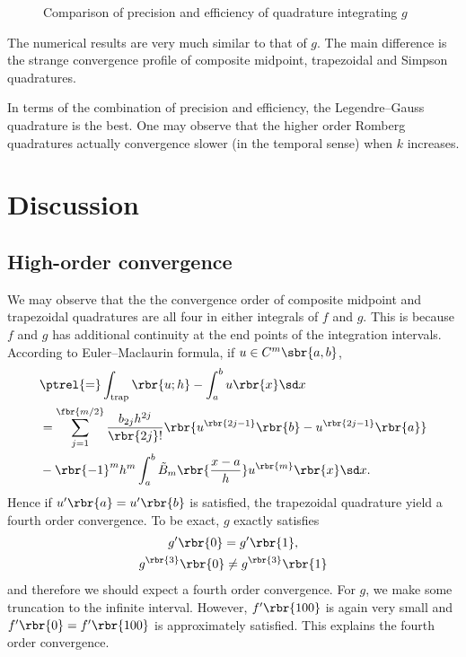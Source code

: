\documentclass[english, nochinese]{pnote}
\begin{document}
\begin{figure}
\centering
\scalebox{0.70}{}
\caption{Comparison of precision and efficiency of quadrature integrating $g$}
\label{Fig:GErrorTime}
\end{figure}

The numerical results are very much similar to that of $g$. The main difference is the strange convergence profile of composite midpoint, trapezoidal and Simpson quadratures.

In terms of the combination of precision and efficiency, the Legendre--Gauss quadrature is the best. One may observe that the higher order Romberg quadratures actually convergence slower (in the temporal sense) when $k$ increases.

\section{Discussion}

\subsection{High-order convergence}

We may observe that the the convergence order of composite midpoint and trapezoidal quadratures are all four in either integrals of $f$ and $g$. This is because $f$ and $g$ has additional continuity at the end points of the integration intervals. According to Euler--Maclaurin formula, if $ u \in C^m \sbr{ a, b } $,
\begin{equation} \label{Eq:EulerMac}
\begin{split}
&\ptrel{=} \int_{\text{trap}} \rbr{ u; h } - \int_a^b u \rbr{x} \sd x \\
&= \sum_{ j = 1 }^{\fbr{ m / 2 }} \frac{ b_{ 2 j } h^{ 2 j } }{ \rbr{ 2 j } ! } \rbr{ u^{\rbr{ 2 j - 1 }} \rbr{b} - u^{\rbr{ 2 j - 1 }} \rbr{a} } \\
&- \rbr{-1}^m h^m \int_a^b \tilde{B}_m \rbr{\frac{ x - a }{h}} u^{\rbr{m}} \rbr{x} \sd x.
\end{split}
\end{equation}
Hence if $ u' \rbr{a} = u' \rbr{b} $ is satisfied, the trapezoidal quadrature yield a fourth order convergence. To be exact, $g$ exactly satisfies
\begin{gather}
g' \rbr{0} = g' \rbr{1}, \\
g^{\rbr{3}} \rbr{0} \neq g^{\rbr{3}} \rbr{1}
\end{gather}
and therefore we should expect a fourth order convergence. For $g$, we make some truncation to the infinite interval. However, $ f' \rbr{100} $ is again very small and $ f' \rbr{0} = f' \rbr{100} $ is approximately satisfied. This explains the fourth order convergence.
\end{document}
